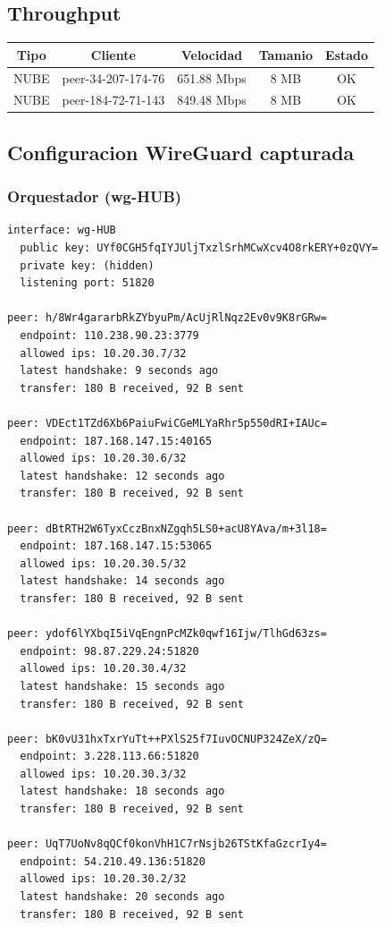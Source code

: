 \documentclass[11pt,a4paper]{article}
\begin{document}
\subsection{Throughput}
\begin{longtable}{|c|c|c|c|c|}
\hline
Tipo & Cliente & Velocidad & Tamanio & Estado \\ \hline
NUBE & peer-34-207-174-76 & 651.88 Mbps & 8 MB & OK \\ \hline
NUBE & peer-184-72-71-143 & 849.48 Mbps & 8 MB & OK \\ \hline
\end{longtable}

\subsection{Configuracion WireGuard capturada}
\subsubsection*{Orquestador (wg-HUB)}
\begin{lstlisting}
interface: wg-HUB
  public key: UYf0CGH5fqIYJUljTxzlSrhMCwXcv4O8rkERY+0zQVY=
  private key: (hidden)
  listening port: 51820

peer: h/8Wr4gararbRkZYbyuPm/AcUjRlNqz2Ev0v9K8rGRw=
  endpoint: 110.238.90.23:3779
  allowed ips: 10.20.30.7/32
  latest handshake: 9 seconds ago
  transfer: 180 B received, 92 B sent

peer: VDEct1TZd6Xb6PaiuFwiCGeMLYaRhr5p550dRI+IAUc=
  endpoint: 187.168.147.15:40165
  allowed ips: 10.20.30.6/32
  latest handshake: 12 seconds ago
  transfer: 180 B received, 92 B sent

peer: dBtRTH2W6TyxCczBnxNZgqh5LS0+acU8YAva/m+3l18=
  endpoint: 187.168.147.15:53065
  allowed ips: 10.20.30.5/32
  latest handshake: 14 seconds ago
  transfer: 180 B received, 92 B sent

peer: ydof6lYXbqI5iVqEngnPcMZk0qwf16Ijw/TlhGd63zs=
  endpoint: 98.87.229.24:51820
  allowed ips: 10.20.30.4/32
  latest handshake: 15 seconds ago
  transfer: 180 B received, 92 B sent

peer: bK0vU31hxTxrYuTt++PXlS25f7IuvOCNUP324ZeX/zQ=
  endpoint: 3.228.113.66:51820
  allowed ips: 10.20.30.3/32
  latest handshake: 18 seconds ago
  transfer: 180 B received, 92 B sent

peer: UqT7UoNv8qQCf0konVhH1C7rNsjb26TStKfaGzcrIy4=
  endpoint: 54.210.49.136:51820
  allowed ips: 10.20.30.2/32
  latest handshake: 20 seconds ago
  transfer: 180 B received, 92 B sent

\end{lstlisting}
\end{document}
